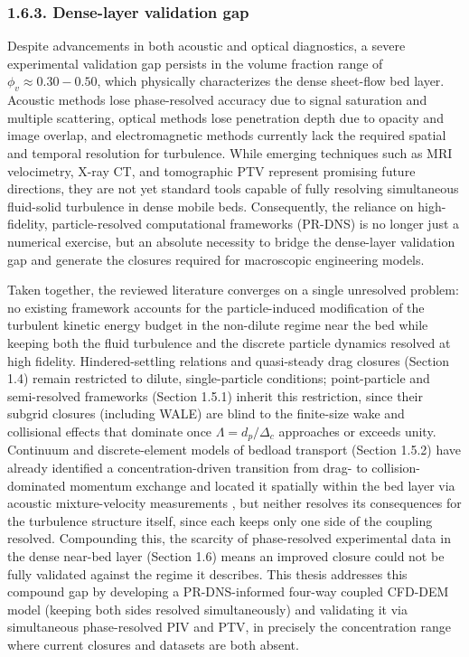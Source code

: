\subsubsection{1.6.3. Dense-layer validation gap}

Despite advancements in both acoustic and optical diagnostics, a severe experimental validation gap persists in the volume fraction range of \(\phi_{v} \approx 0.30 - 0.50\), which physically characterizes the dense sheet-flow bed layer. Acoustic methods lose phase-resolved accuracy due to signal saturation and multiple scattering, optical methods lose penetration depth due to opacity and image overlap, and electromagnetic methods currently lack the required spatial and temporal resolution for turbulence. While emerging techniques such as MRI velocimetry, X-ray CT, and tomographic PTV represent promising future directions, they are not yet standard tools capable of fully resolving simultaneous fluid-solid turbulence in dense mobile beds. Consequently, the reliance on high-fidelity, particle-resolved computational frameworks (PR-DNS) is no longer just a numerical exercise, but an absolute necessity to bridge the dense-layer validation gap and generate the closures required for macroscopic engineering models.

Taken together, the reviewed literature converges on a single unresolved problem: no existing framework accounts for the particle-induced modification of the turbulent kinetic energy budget in the non-dilute regime near the bed while keeping both the fluid turbulence and the discrete particle dynamics resolved at high fidelity. Hindered-settling relations and quasi-steady drag closures (Section 1.4) remain restricted to dilute, single-particle conditions; point-particle and semi-resolved frameworks (Section 1.5.1) inherit this restriction, since their subgrid closures (including WALE) are blind to the finite-size wake and collisional effects that dominate once $\Lambda = d_p/\Delta_c$ approaches or exceeds unity. Continuum and discrete-element models of bedload transport (Section 1.5.2) have already identified a concentration-driven transition from drag- to collision-dominated momentum exchange \cite{maurin__2016} and located it spatially within the bed layer via acoustic mixture-velocity measurements \cite{revil-baudard__2015}, but neither resolves its consequences for the turbulence structure itself, since each keeps only one side of the coupling resolved. Compounding this, the scarcity of phase-resolved experimental data in the dense near-bed layer (Section 1.6) means an improved closure could not be fully validated against the regime it describes. This thesis addresses this compound gap by developing a PR-DNS-informed four-way coupled CFD-DEM model (keeping both sides resolved simultaneously) and validating it via simultaneous phase-resolved PIV and PTV, in precisely the concentration range where current closures and datasets are both absent.

